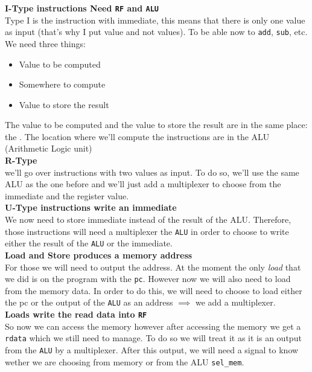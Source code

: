 \textbf{I-Type instructions Need \texttt{RF} and \texttt{ALU}}\\
	Type I is the instruction with immediate, this means that there is only one value as input (that's why I put value and not values).
    To be able now to \texttt{add}, \texttt{sub}, etc. We need three things:
	\begin{itemize}
	    \item Value to be computed
	    \item Somewhere to compute
	    \item Value to store the result
	\end{itemize}
	The value to be computed and the value to store the result are in the same place: the . The location where we'll compute the instructions are in the ALU (Arithmetic Logic unit)\\

\textbf{R-Type}\\
	we'll go over instructions with two values as input. To do so, we'll use the same ALU as the one before and we'll just add a multiplexer to choose from the immediate and the register value.\\

\textbf{U-Type instructions write an immediate}\\
    We now need to store immediate instead of the result of the ALU. Therefore, those instructions will need a multiplexer  the \texttt{ALU} in order to choose to write either the result of the \texttt{ALU} or the immediate.\\

\textbf{Load and Store produces a memory address}\\
    For those we will need to output the address. At  the moment the only \textit{load} that we did is on the program with the \texttt{pc}. However now we will also need to load from the memory data. In order to do this, we will need to choose to load either the pc or the output of the \texttt{ALU} as an address $\implies$ we add a multiplexer.\\

\textbf{Loads write the read data into \texttt{RF}}\\
    So now we can access the memory however after accessing the memory we get a \texttt{rdata} which we still need to manage. To do so we will treat it as it is an output from the \texttt{ALU} by  a multiplexer. After this output, we will need a signal to know wether we are choosing from memory or from the ALU \texttt{sel\_mem}.\\

